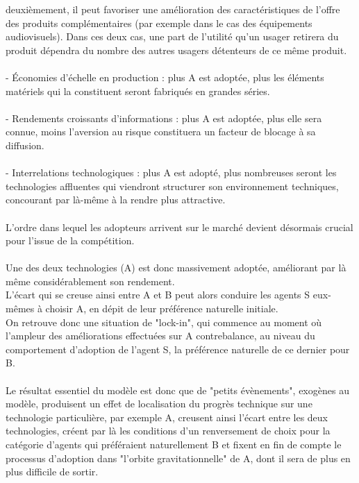 \documentclass[a4paper, 10pt]{article}
\begin{document}
deuxièmement, il peut favoriser une amélioration des caractéristiques de l'offre des produits complémentaires (par exemple dans le cas des équipements audiovisuels).
Dans ces deux cas, une part de l'utilité qu'un usager retirera du produit dépendra du nombre des autres usagers détenteurs de ce même produit.\\ \\
- Économies d'échelle en production : plus A est adoptée, plus les éléments matériels qui la constituent seront fabriqués en grandes séries.\\ \\
- Rendements croissants d'informations : plus A est adoptée, plus elle sera connue, moins l'aversion au risque constituera un facteur de blocage à sa diffusion.\\ \\
- Interrelations technologiques : plus A est adopté, plus nombreuses seront les technologies affluentes qui viendront structurer son environnement techniques, concourant par là-même à la rendre plus attractive.\\ \\
L'ordre dans lequel les adopteurs arrivent sur le marché devient désormais crucial pour l'issue de la compétition.\\ \\
Une des deux technologies (A) est donc massivement adoptée, améliorant par là même considérablement son rendement.\\
L'écart qui se creuse ainsi entre A et B peut alors conduire les agents S eux-mêmes à choisir A,
en dépit de leur préférence naturelle initiale.\\
On retrouve donc une situation de "lock-in", qui commence au moment où l'ampleur des améliorations effectuées sur A contrebalance,
au niveau du comportement d'adoption de l'agent S, la préférence naturelle de ce dernier pour B.\\ \\
Le résultat essentiel du modèle est donc que de "petits évènements", exogènes au modèle, produisent un effet de localisation du progrès technique sur une technologie particulière, par exemple A,
creusent ainsi l'écart entre les deux technologies, créent par là les conditions d'un renversement de choix pour la catégorie d'agents qui préféraient naturellement B et fixent en fin de compte le processus d'adoption dans "l'orbite gravitationnelle" de A, dont il sera de plus en plus difficile de sortir.\\ \\
\end{document}
